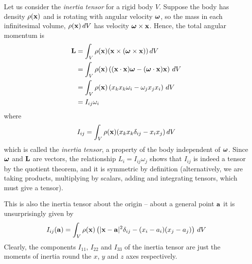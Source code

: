 \documentclass{../template/note}
\begin{document}
    \begin{example*}
        Let us consider the \emph{inertia tensor} for a rigid body \(V\). Suppose the body has density \(\rho(\V x)\) and is rotating with angular velocity \(\V \omega\), so the mass in each infinitesimal volume, \(\rho(\V x) \D V\) has velocity \(\V \omega \times \V x\). Hence, the total angular momentum is
        \begin{align*}
            \V L &= \int_V \rho(\V x) (\V x \times (\V \omega \times \V x)) \D V \\
            &= \int_V \rho(\V x) \left((\V x \cdot \V x) \V \omega - (\V \omega \cdot \V x) \V x\right) \D V \\
            &= \int_V \rho(\V x) \left(x_kx_k\omega_i - \omega_jx_jx_i\right) \D V \\
            &= I_{ij}\omega_i
        \end{align*}
        where
        \begin{align*}
            I_{ij} = \int_V \rho(\V x) (x_kx_k \delta_{ij}-x_ix_j) \D V
        \end{align*}
        which is called the \emph{inertia tensor}, a property of the body independent of \(\V \omega\). Since \(\V \omega\) and \(\V L\) are vectors, the relationship \(L_i = I_{ij}\omega_j\) shows that \(I_{ij}\) is indeed a tensor by the quotient theorem, and it is symmetric by definition (alternatively, we are taking products, multiplying by scalars, adding and integrating tensors, which must give a tensor).

        This is also the inertia tensor about the origin -- about a general point \(\V a\) it is unsurprisingly given by
        \begin{align*}
            I_{ij}(\V a) = \int_V \rho(\V x) \left(|\V x-\V a|^2\delta_{ij} - (x_i-a_i)(x_j-a_j)\right) \D V
        \end{align*}
        Clearly, the components \(I_{11}\), \(I_{22}\) and \(I_{33}\) of the inertia tensor are just the moments of inertia round the \(x\), \(y\) and \(z\) axes respectively.       
    \end{example*}
    
\end{document}
